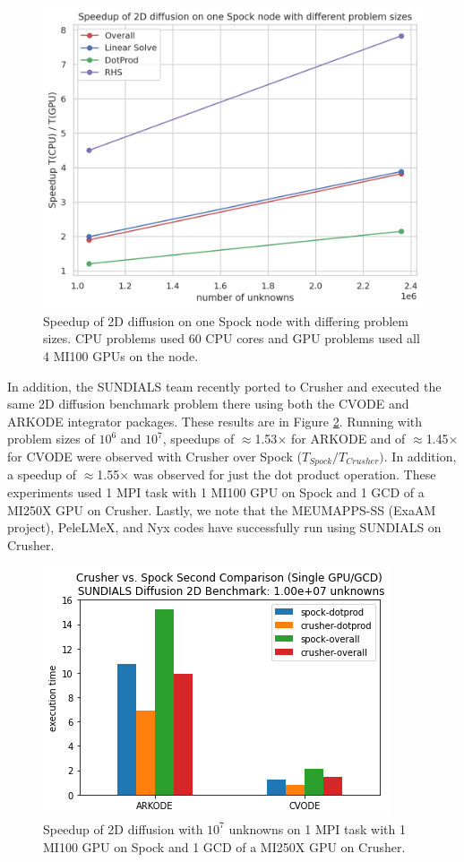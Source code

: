 \begin{figure}[htb]
	\centering
	\includegraphics[width=0.6\linewidth]{projects/2.3.3-MathLibs/2.3.3.12-SUNDIALS-hypre/SpockResults-Dec2021.png}
	\caption{\label{fig:sun-spock-12-21} Speedup of 2D diffusion on one Spock node with differing problem sizes.  CPU problems used 60 CPU cores and GPU problems used all 4 MI100 GPUs on the node.}
\end{figure}

In addition, the SUNDIALS team recently ported to Crusher and executed the same 2D diffusion benchmark problem there using both the CVODE and ARKODE integrator packages.  
These results are in Figure \ref{fig:sun-crusher-spock-2-22}.
Running with problem sizes of $10^6$ and $10^7$, speedups of $\approx$1.53$\times$ for ARKODE and of $\approx$1.45$\times$ for CVODE were observed with Crusher over Spock ($T_{Spock} / T_{Crusher}).$  In addition, a speedup of $\approx$1.55$\times$ was observed for just the dot product operation.  These experiments used 1 MPI task with 1 MI100 GPU on Spock and 1 GCD of a MI250X GPU on Crusher.  Lastly, we note that the MEUMAPPS-SS (ExaAM project), PeleLMeX, and Nyx codes have successfully run using SUNDIALS on Crusher.

\begin{figure}[htb]
	\centering
	\includegraphics[width=0.6\linewidth]{projects/2.3.3-MathLibs/2.3.3.12-SUNDIALS-hypre/crusher-spock-1e7-Feb2022.png}
	\caption{\label{fig:sun-crusher-spock-2-22} Speedup of 2D diffusion with $10^7$ unknowns on 1 MPI task with 1 MI100 GPU on Spock and 1 GCD of a MI250X GPU on Crusher.}
\end{figure}

